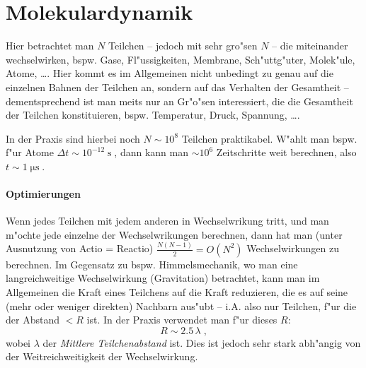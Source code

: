 \documentclass[a4paper]{book}
\begin{document}
\section{Molekulardynamik}
\label{sec:molekulardynamik}

Hier betrachtet man $N$ Teilchen -- jedoch mit sehr gro"sen $N$ -- die
miteinander wechselwirken, bspw. Gase, Fl"ussigkeiten, Membrane,
Sch"uttg"uter, Molek"ule, Atome, \dots. Hier kommt es im Allgemeinen
nicht unbedingt zu genau auf die einzelnen Bahnen der Teilchen an,
sondern auf das Verhalten der Gesamtheit -- dementsprechend ist man
meits nur an Gr"o"sen interessiert, die die Gesamtheit der Teilchen
konstituieren, bspw. Temperatur, Druck, Spannung, \dots.

In der Praxis sind hierbei noch $N \sim 10^8$ Teilchen
praktikabel. W"ahlt man bspw. f"ur Atome $\Delta t \sim
10^{-12}\operatorname{s}$, dann kann man $\sim 10^6$ Zeitschritte weit
berechnen, also $t \sim 1\operatorname{\mu s}$.

\paragraph{Optimierungen}
\label{sec:optimierungen}

Wenn jedes Teilchen mit jedem anderen in
Wechselwrikung tritt, und man m"ochte jede einzelne der
Wechselwrikungen berechnen, dann hat man (unter Ausnutzung von Actio =
Reactio) $\frac{N(N-1)} 2 = O(N^2)$ Wechselwirkungen zu berechnen. Im
Gegensatz zu bspw. Himmelsmechanik, wo man eine langreichweitige
Wechselwirkung (Gravitation) betrachtet, kann man im Allgemeinen die
Kraft eines Teilchens auf die Kraft reduzieren, die es auf seine (mehr
oder weniger direkten) Nachbarn aus"ubt -- i.A. also nur Teilchen,
f"ur die der Abstand $< R$ ist. In der Praxis verwendet man f"ur dieses $R$:
\begin{equation*}
  R \sim 2.5 \, \lambda \;,
\end{equation*}
wobei $\lambda$ der \emph{Mittlere Teilchenabstand} ist. Dies ist
jedoch sehr stark abh"angig von der Weitreichweitigkeit der Wechselwirkung.
\end{document}
